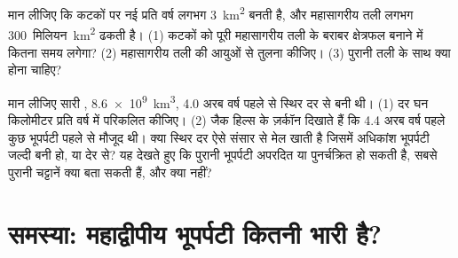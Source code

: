 \begin{exercise}[$\star\star\star$]\label{exo:g12:continental-crust:14}
मान लीजिए कि कटकों पर नई  प्रति वर्ष लगभग \qty{3}{km^2}
बनती है, और महासागरीय तली लगभग \num{300}~मिलियन~\unit{km^2} ढकती है। (1)
कटकों को पूरी महासागरीय तली के बराबर क्षेत्रफल बनाने में कितना समय लगेगा? (2)
महासागरीय तली की आयुओं से तुलना कीजिए। (3) पुरानी तली के साथ क्या होना
चाहिए?
\end{exercise}

\begin{exercise}[$\star\star\star$]\label{exo:g12:continental-crust:15}
मान लीजिए सारी , \qty{8.6e9}{km^3}, 4.0 अरब वर्ष पहले से
स्थिर दर से बनी थी। (1) दर घन किलोमीटर प्रति वर्ष में परिकलित कीजिए। (2) जैक हिल्स
के ज़र्कॉन दिखाते हैं कि 4.4 अरब वर्ष पहले कुछ भूपर्पटी पहले से मौजूद थी। क्या
स्थिर दर ऐसे संसार से मेल खाती है जिसमें अधिकांश भूपर्पटी जल्दी बनी हो, या
देर से? यह देखते हुए कि पुरानी भूपर्पटी अपरदित या पुनर्चक्रित हो सकती है, सबसे पुरानी चट्टानें क्या बता सकती हैं, और
क्या नहीं?
\end{exercise}

\section{समस्या: महाद्वीपीय भूपर्पटी कितनी भारी है?}

